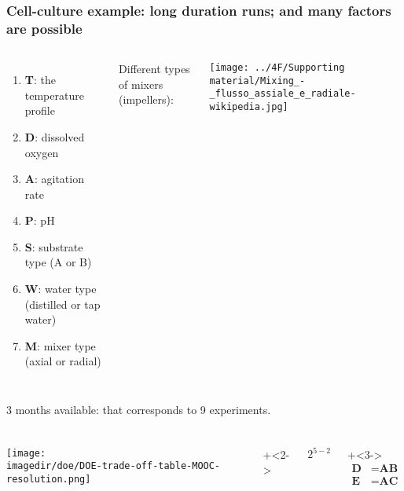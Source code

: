 \begin{frame}\frametitle{Cell-culture example: long duration runs; and many factors are possible}
	\begin{columns}[c]
			\begin{enumerate}
				\item	\textbf{T}: the temperature profile
				\item	\textbf{D}: dissolved oxygen
				\item	\textbf{A}: agitation rate
				\item	\textbf{P}: pH
				\item	\textbf{S}: substrate type (A or B)
				\item	\textbf{W}: water type (distilled or tap water)
				\item	\textbf{M}: mixer type (axial or radial)
		
			\end{enumerate}
		
			{\color{blue} \small Different types of mixers (impellers):} 
			
			\vspace{0.2cm}
			
			\centerline{\texttt{[image: ../4F/Supporting material/Mixing\_-\_flusso\_assiale\_e\_radiale-wikipedia.jpg]}}
			
	\end{columns}

	\vfill
	3 months available: {\color{myOrange} that corresponds to 9 experiments}.
	
\end{frame}

\begin{frame}\frametitle{}
	\begin{columns}[T]
			\texttt{[image: \\imagedir/doe/DOE-trade-off-table-MOOC-resolution.png]}
		
			
			\onslide+<2->{
				\vspace{2cm}
				{\Huge
					$2^{5-2}$
				} 
			 
				\vspace{2cm}
				\onslide+<3->{ 
					\begin{align*}
						\textbf{D} &= \textbf{AB}\\
						\textbf{E}\, &= \textbf{AC} 
					\end{align*}
				}
			}
	\end{columns}
	
\end{frame}

